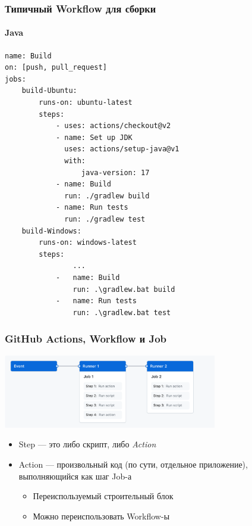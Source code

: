\documentclass{../../slides-style}
\begin{document}
    \begin{frame}[fragile]
        \frametitle{Типичный Workflow для сборки}
        \framesubtitle{Java}
        \begin{scriptsize}
            \begin{verbatim}
name: Build
on: [push, pull_request]
jobs:
    build-Ubuntu:
        runs-on: ubuntu-latest
        steps:
            - uses: actions/checkout@v2
            - name: Set up JDK
              uses: actions/setup-java@v1
              with:
                  java-version: 17
            - name: Build
              run: ./gradlew build
            - name: Run tests
              run: ./gradlew test
    build-Windows:
        runs-on: windows-latest
        steps:
                ...
            -   name: Build
                run: .\gradlew.bat build
            -   name: Run tests
                run: .\gradlew.bat test
            \end{verbatim}
        \end{scriptsize}
    \end{frame}

    \begin{frame}
        \frametitle{GitHub Actions, Workflow и Job}
        \begin{center}
            \includegraphics[width=0.7\textwidth]{githubActionsWorkflow.png}
        \end{center}
        \begin{itemize}
            \item Step --- это либо скрипт, либо \emph{Action}
            \item Action --- произвольный код (по сути, отдельное приложение), выполняющийся как шаг Job-а
            \begin{itemize}
                \item Переиспользуемый строительный блок
                \item Можно переиспользовать Workflow-ы
            \end{itemize}
        \end{itemize}
    \end{frame}
\end{document}
